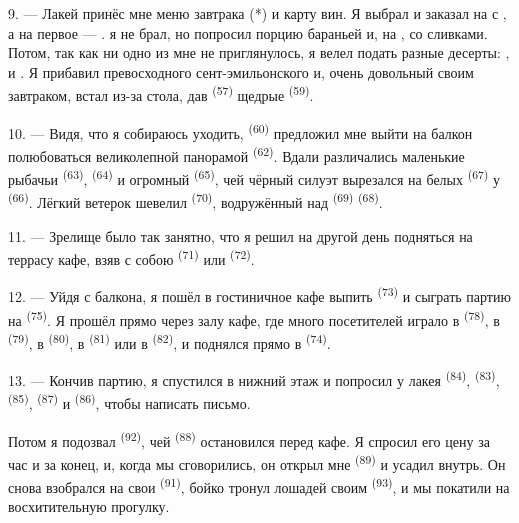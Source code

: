 9. --- Лакей принёс мне меню завтрака (*) и карту вин. Я выбрал и заказал
на   с , а на первое ---
.  я не брал, но попросил порцию
бараньей  и, на ,  со сливками.
Потом, так как ни одно из  мне не приглянулось, я
велел подать разные десерты: ,  и
. Я прибавил превосходного сент-эмильонского 
и, очень довольный своим завтраком, встал из-за стола, дав
 \textsuperscript{(57)} щедрые  \textsuperscript{(59)}.

10. --- Видя, что я собираюсь уходить,  \textsuperscript{(60)}
предложил мне выйти на балкон полюбоваться великолепной панорамой
 \textsuperscript{(62)}. Вдали различались маленькие рыбачьи
 \textsuperscript{(63)},  \textsuperscript{(64)} и
огромный  \textsuperscript{(65)}, чей чёрный силуэт вырезался на
белых  \textsuperscript{(67)} у  \textsuperscript{(66)}.
Лёгкий ветерок шевелил  \textsuperscript{(70)}, водружённый над
 \textsuperscript{(69)}  \textsuperscript{(68)}.

\VUsaut{3.0mm}
\VUsaut{3.0mm}

11. --- Зрелище было так занятно, что я решил на другой день подняться на
террасу кафе, взяв с собою  \textsuperscript{(71)} или
 \textsuperscript{(72)}.

12. --- Уйдя с балкона, я пошёл в гостиничное кафе выпить 
\textsuperscript{(73)} и сыграть партию на  \textsuperscript{(75)}. Я
прошёл прямо через залу кафе, где много посетителей играло в
 \textsuperscript{(78)}, в  \textsuperscript{(79)}, в
 \textsuperscript{(80)}, в  \textsuperscript{(81)} или в
 \textsuperscript{(82)}, и поднялся прямо в 
\textsuperscript{(74)}.

13. --- Кончив партию, я спустился в нижний этаж и попросил у лакея
 \textsuperscript{(84)},  \textsuperscript{(83)},
 \textsuperscript{(85)},  \textsuperscript{(87)} и
 \textsuperscript{(86)}, чтобы написать письмо.

Потом я подозвал  \textsuperscript{(92)}, чей 
\textsuperscript{(88)} остановился перед кафе. Я спросил его цену за час и за
конец, и, когда мы сговорились, он открыл мне 
\textsuperscript{(89)} и усадил внутрь. Он снова взобрался на свои 
\textsuperscript{(91)}, бойко тронул лошадей своим 
\textsuperscript{(93)}, и мы покатили на восхитительную прогулку.
\VUsaut{6.0mm}
\VUfilet{22mm}
